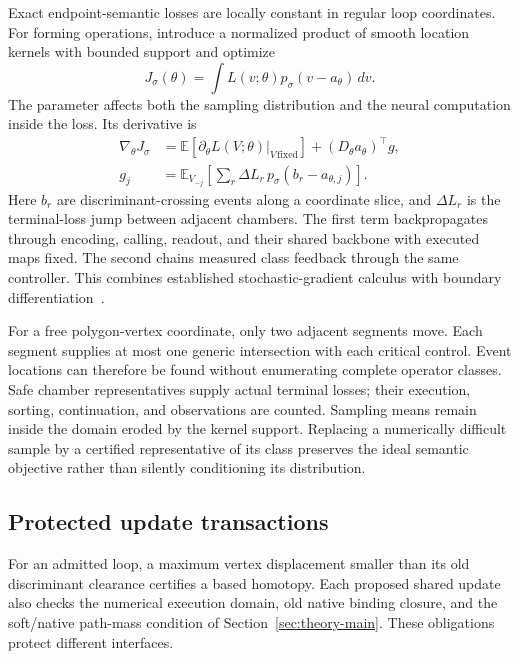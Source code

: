 Exact endpoint-semantic losses are locally constant in regular loop
coordinates. For forming operations, introduce a normalized product of smooth
location kernels with bounded support and optimize
\begin{equation}
 J_\sigma(\theta)=\int L(v;\theta)p_\sigma(v-a_\theta)\,dv.
\end{equation}
The parameter affects both the sampling distribution and the neural
computation inside the loss. Its derivative is
\begin{equation}
 \begin{aligned}
 \nabla_\theta J_\sigma&=
 \mathbb E[\partial_\theta L(V;\theta)\vert_{V\,\mathrm{fixed}}]
 +(D_\theta a_\theta)^\top g,\\
 g_j&=\mathbb E_{V_{-j}}\!\left[
       \sum_r\Delta L_r\,p_\sigma(b_r-a_{\theta,j})\right].
 \end{aligned}
 \label{eq:main-coupled-gradient}
\end{equation}
Here $b_r$ are discriminant-crossing events along a coordinate slice, and
$\Delta L_r$ is the terminal-loss jump between adjacent chambers. The first
term backpropagates through encoding, calling, readout, and their shared
backbone with executed maps fixed. The second chains measured class feedback
through the same controller. This combines established stochastic-gradient
calculus with boundary differentiation~\cite{schulman2015stochastic,lee2018reparameterization}.

For a free polygon-vertex coordinate, only two adjacent segments move. Each
segment supplies at most one generic intersection with each critical control.
Event locations can therefore be found without enumerating complete operator
classes. Safe chamber representatives supply actual terminal losses; their
execution, sorting, continuation, and observations are counted. Sampling means
remain inside the domain eroded by the kernel support. Replacing a numerically
difficult sample by a certified representative of its class preserves the
ideal semantic objective rather than silently conditioning its distribution.

\subsection{Protected update transactions}

For an admitted loop, a maximum vertex displacement smaller than its old
discriminant clearance certifies a based homotopy. Each proposed shared update
also checks the numerical execution domain, old native binding closure, and
the soft/native path-mass condition of
Section~\ref{sec:theory-main}. These obligations protect different interfaces.

